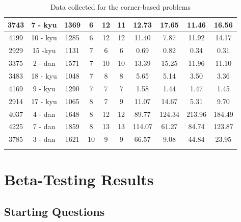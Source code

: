 \documentclass{l4proj}
\begin{document}
\begin{appendices}
\begin{longtable}{|c|c|c|c|c|c|c|c|c|c|}
3743 & 7 - kyu & 1369 & 6 & 12 & 11 & 12.73 & 17.65 & 11.46 & 16.56 \\ \hline
4199 & 10 - kyu & 1285 & 6 & 12 & 12 & 11.40 & 7.87 & 11.92 & 14.17 \\ \hline
2929 & 15 -kyu & 1131 & 7 & 6 & 6 & 0.69 & 0.82 & 0.34 & 0.31 \\ \hline
3375 & 2 - dan & 1571 & 7 & 10 & 10 & 13.39 & 15.25 & 11.96 & 11.10 \\ \hline
3483 & 18 - kyu & 1048 & 7 & 8 & 8 & 5.65 & 5.14 & 3.50 & 3.36 \\ \hline
4169 & 9 - kyu & 1290 & 7 & 7 & 7 & 1.58 & 1.44 & 1.47 & 1.45 \\ \hline
2914 & 17 - kyu & 1065 & 8 & 7 & 9 & 11.07 & 14.67 & 5.31 & 9.70 \\ \hline
4037 & 4 - dan & 1648 & 8 & 12 & 12 & 89.77 & 124.34 & 213.96 & 184.49 \\ \hline
4225 & 7 - dan & 1859 & 8 & 13 & 13 & 114.07 & 61.27 & 84.74 & 123.87 \\ \hline
3785 & 3 - dan & 1621 & 10 & 9 & 9 & 66.57 & 9.08 & 44.84 & 23.95 \\ \hline
\caption{ Data collected for the corner-based problems}
\label{table:data-corner}
\end{longtable}





\chapter{Beta-Testing Results}

%  
%



\section{Starting Questions}



\end{appendices}
\end{document}
